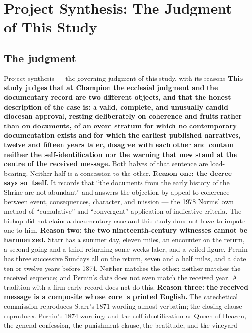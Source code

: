 \section{Project Synthesis: The Judgment of This Study}

\subsection{The judgment}

\begin{judgmentbox}{Project synthesis --- the governing judgment of
this study, with its reasons}
\textbf{This study judges that at Champion the ecclesial judgment and
the documentary record are two different objects, and that the honest
description of the case is: a valid, complete, and unusually candid
diocesan approval, resting deliberately on coherence and fruits rather
than on documents, of an event stratum for which no contemporary
documentation exists and for which the earliest published narratives,
twelve and fifteen years later, disagree with each other and contain
neither the self-identification nor the warning that now stand at the
centre of the received message.} Both halves of that sentence are
load-bearing. Neither half is a concession to the other.\jsep
\textbf{Reason one: the decree says so itself.} It records that ``the
documents from the early history of the Shrine are not abundant''
and answers the objection by appeal to coherence between event,
consequences, character, and mission --- the 1978 Norms' own method of
``cumulative'' and ``convergent'' application of indicative criteria.
The bishop did not claim a documentary case and this study does not
have to impute one to him.\jsep
\textbf{Reason two: the two nineteenth-century witnesses cannot be
harmonized.} Starr has a summer day, eleven miles, an encounter on the
return, a second going and a third returning some weeks later, and a
veiled figure. Pernin has three successive Sundays all on the return,
seven and a half miles, and a date ten or twelve years before 1874.
Neither matches the other; neither matches the received sequence; and
Pernin's date does not even match the received year. A tradition with a
firm early record does not do this.\jsep
\textbf{Reason three: the received message is a composite whose core is
printed English.} The catechetical commission reproduces Starr's 1871
wording almost verbatim; the closing clause reproduces Pernin's 1874
wording; and the self-identification as Queen of Heaven, the general
confession, the punishment clause, the beatitude, and the vineyard

\end{judgmentbox}
